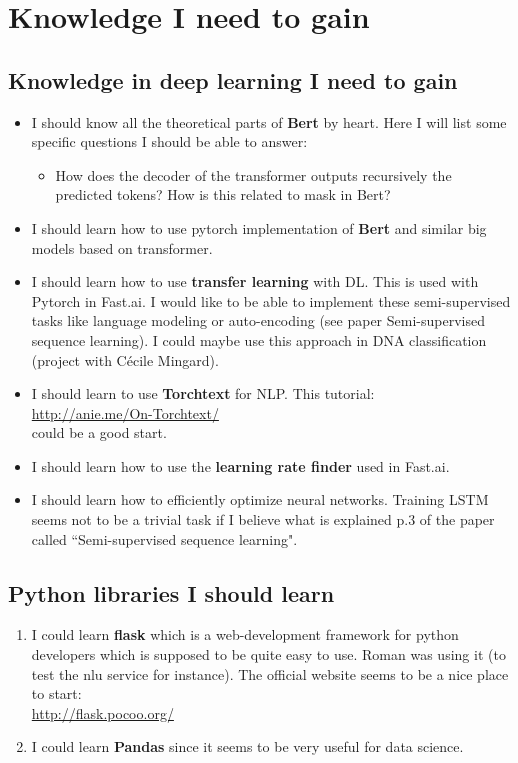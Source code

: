 \documentclass[11pt,a4paper]{article}
\begin{document}
\section{Knowledge I need to gain}

\subsection{Knowledge in deep learning I need to gain}
\begin{itemize}
\item I should know all the theoretical parts of \textbf{Bert} by heart. Here I will list some specific questions I should be able to answer:
\begin{itemize}
\item How does the decoder of the transformer outputs recursively the predicted tokens? How is this related to mask in Bert?
\end{itemize}
\item I should learn how to use pytorch implementation of \textbf{Bert} and similar big models based on transformer.
\item I should learn how to use \textbf{transfer learning} with DL. This is used with Pytorch in Fast.ai. I would like to be able to implement these semi-supervised tasks like language modeling or auto-encoding (see paper Semi-supervised sequence learning). I could maybe use this approach in DNA classification (project with Cécile Mingard).
\item I should learn to use \textbf{Torchtext} for NLP. This tutorial:\\
\url{http://anie.me/On-Torchtext/}\\
could be a good start.
\item I should learn how to use the \textbf{learning rate finder} used in Fast.ai.
\item I should learn how to efficiently optimize neural networks. Training LSTM seems not to be a trivial task if I believe what is explained p.3 of the paper called ``Semi-supervised sequence learning".
\end{itemize}

\subsection{Python libraries I should learn}
\begin{enumerate}
\item I could learn \textbf{flask} which is  a web-development framework for python developers which is supposed to be quite easy to use. Roman was using it (to test the nlu service for instance). The official website seems to be a nice place to start:\\
\url{http://flask.pocoo.org/}
\item I could learn \textbf{Pandas} since it seems to be very useful for data science.
\end{enumerate}
\end{document}
